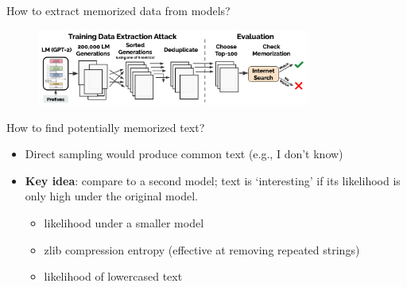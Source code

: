 \documentclass[usenames,dvipsnames,notes,11pt,aspectratio=169,hyperref={colorlinks=true, linkcolor=blue}]{beamer}
\begin{document}
\begin{frame}
    {How to extract memorized data from models?}
            \begin{figure}
            \includegraphics[width=0.8\textwidth]{figures/mem-gpt2-method}
            \end{figure}
            \vspace{-2em}

            How to find potentially memorized text?\\
            \begin{itemize}
                \item Direct sampling would produce common text (e.g., I don't know)
            \pause
                \item \textbf{Key idea}: compare to a second model; text is `interesting' if its likelihood is only high under the original model.
                    \begin{itemize}
                        \item likelihood under a smaller model 
                        \item zlib compression entropy (effective at removing repeated strings)
                        \item likelihood of lowercased text 
                    \end{itemize}
            \end{itemize}
\end{frame}
\end{document}
